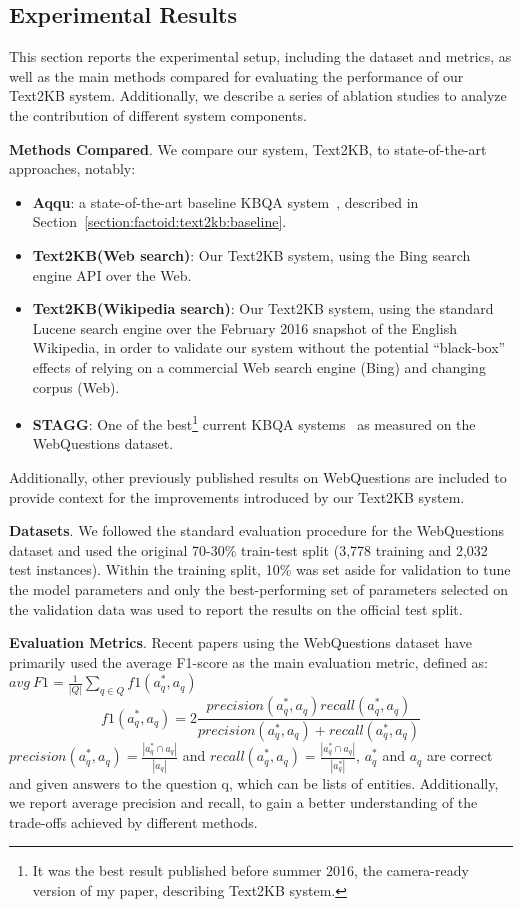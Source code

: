 \subsection{Experimental Results}
\label{section:factoid:text2kb:eval}

This section reports the experimental setup, including the dataset and metrics, as well as the main methods compared for evaluating the performance of our Text2KB system. Additionally, we describe a series of ablation studies to analyze the contribution of different system components.

\textbf{Methods Compared}.
We compare our system, Text2KB, to state-of-the-art approaches, notably:
\begin{itemize}
\item{\textbf{Aqqu}}: a state-of-the-art baseline KBQA system~\cite{bastmore:cikm:2015:aquu}, described in Section~\ref{section:factoid:text2kb:baseline}.
\item{\textbf{Text2KB(Web search)}}: Our Text2KB system, using the Bing search engine API over the Web. 
\item{\textbf{Text2KB(Wikipedia search)}}: Our Text2KB system, using the standard Lucene search engine over the February 2016 snapshot of the English Wikipedia, in order to validate our system without the potential ``black-box'' effects of relying on a commercial Web search engine (Bing) and changing corpus (Web).
\item{\textbf{STAGG}}: One of the best\footnote{It was the best result published before summer 2016, \ie the camera-ready version of my paper, describing Text2KB system.} current KBQA systems~\cite{yih:ACL:2015:STAGG} as measured on the WebQuestions dataset.
\end{itemize}
Additionally, other previously published results on WebQuestions are included to provide context for the improvements introduced by our Text2KB system.

\textbf{Datasets}.
We followed the standard evaluation procedure for the WebQuestions dataset and used the original 70-30\% train-test split (3,778 training and 2,032 test instances). Within the training split, 10\% was set aside for validation to tune the model parameters and only the best-performing set of parameters selected on the validation data was used to report the results on the official test split.

\textbf{Evaluation Metrics}. 
Recent papers using the WebQuestions dataset have primarily used the average F1-score as the main evaluation metric, defined as:
$avg\ F1 = \frac{1}{|Q|} \sum_{q \in Q} f1(a^*_q, a_q)$
$$f1(a^*_q, a_q) = 2\frac{precision(a^*_q,a_q) recall(a^*_q,a_q)}{precision(a^*_q,a_q) + recall(a^*_q,a_q)}$$
$precision(a^*_q, a_q)=\frac{|a^*_q \cap a_q|}{|a_q|}$ and $recall(a^*_q, a_q) = \frac{|a^*_q \cap a_q|}{|a^*_q|}$, $a^*_q$ and $a_q$ are correct and given answers to the question q, which can be lists of entities.
Additionally, we report average precision and recall, to gain a better understanding of the trade-offs achieved by different methods.

